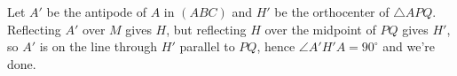 Let $A'$ be the antipode of $A$ in $\left(ABC\right)$ and $H'$ be the orthocenter of $\triangle{APQ}$. Reflecting $A'$ over $M$ gives $H$, but reflecting $H$ over the midpoint of $PQ$ gives $H'$, so $A'$ is on the line through $H'$ parallel to $PQ$, hence $\angle{A'H'A}=90^{\circ}$ and we're done.